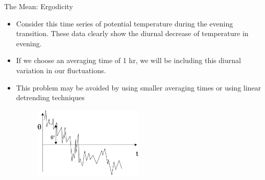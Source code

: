 \begin{frame}{The Mean: Ergodicity}

\begin{itemize}
	\item Consider this time series of potential temperature during the evening transition. These data clearly show the diurnal decrease of temperature in evening.  
	\item If we choose an averaging time of 1 hr, we will be including this diurnal variation in our fluctuations. 
	\item This problem may be avoided by using smaller averaging times or using linear detrending techniques
	\begin{figure}
		\includegraphics[width=0.5\textwidth]{nonstationary.png}
	\end{figure}
\end{itemize}
\end{frame}

